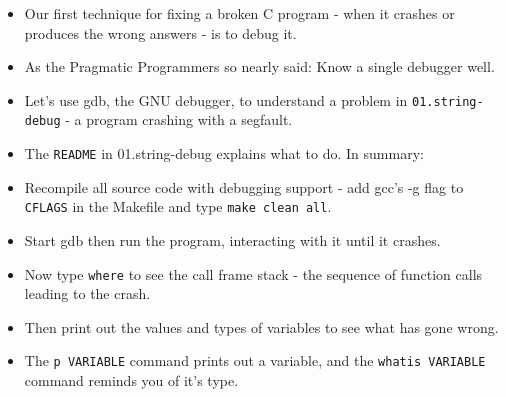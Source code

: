 \documentclass[handout]{beamer}
\begin{document}
\begin{frame}[fragile]
    \begin{itemize}
      \item
      Our first technique for fixing a broken C program - when it crashes or produces
      the wrong answers - is to \alert{debug it}.
      \item
      As the Pragmatic Programmers so nearly said: \alert{Know a single debugger well}.
    \pause
      \item
      Let's use \alert{gdb}, the GNU debugger, to understand a problem in
      \verb+01.string-debug+ - a program crashing with a segfault.
    \pause
      \item
      The \verb+README+ in 01.string-debug explains what to do.  In summary:
      \item
      \alert{Recompile all source code with debugging support} - add gcc's
      \alert{-g} flag to \verb+CFLAGS+ in the Makefile and type \verb+make clean all+.
    \pause
      \item
      \alert{Start gdb} then run the program, interacting with it \alert{until it crashes}.
      \item
      Now type \verb+where+ to see
      \alert{the call frame stack} - the sequence of
      function calls leading to the crash.
    \pause
      \item
      Then print out the values and types of variables to see what has gone wrong.
      \item
      The \verb+p VARIABLE+ command prints out a variable, and the
      \verb+whatis VARIABLE+ command reminds you of it's type.
    \end{itemize}
\end{frame}
\end{document}
